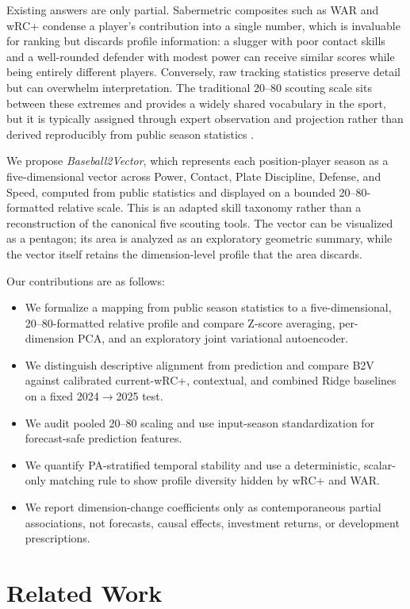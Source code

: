 \documentclass[10pt,twocolumn,letterpaper]{article}
\begin{document}
Existing answers are only partial. Sabermetric composites such as WAR and wRC+ condense a player's contribution into a single number, which is invaluable for ranking but discards profile information: a slugger with poor contact skills and a well-rounded defender with modest power can receive similar scores while being entirely different players. Conversely, raw tracking statistics preserve detail but can overwhelm interpretation. The traditional 20--80 scouting scale sits between these extremes and provides a widely shared vocabulary in the sport, but it is typically assigned through expert observation and projection rather than derived reproducibly from public season statistics \cite{mcdaniel2014}.

We propose \emph{Baseball2Vector}, which represents each position-player season as a five-dimensional vector across Power, Contact, Plate Discipline, Defense, and Speed, computed from public statistics and displayed on a bounded 20--80-formatted relative scale. This is an adapted skill taxonomy rather than a reconstruction of the canonical five scouting tools. The vector can be visualized as a pentagon; its area is analyzed as an exploratory geometric summary, while the vector itself retains the dimension-level profile that the area discards.

Our contributions are as follows:
\begin{itemize}
  \item We formalize a mapping from public season statistics to a five-dimensional, 20--80-formatted relative profile and compare Z-score averaging, per-dimension PCA, and an exploratory joint variational autoencoder.
  \item We distinguish descriptive alignment from prediction and compare B2V against calibrated current-wRC+, contextual, and combined Ridge baselines on a fixed 2024$\to$2025 test.
  \item We audit pooled 20--80 scaling and use input-season standardization for forecast-safe prediction features.
  \item We quantify PA-stratified temporal stability and use a deterministic, scalar-only matching rule to show profile diversity hidden by wRC+ and WAR.
  \item We report dimension-change coefficients only as contemporaneous partial associations, not forecasts, causal effects, investment returns, or development prescriptions.
\end{itemize}

\section{Related Work}
\label{sec:related}
\end{document}
